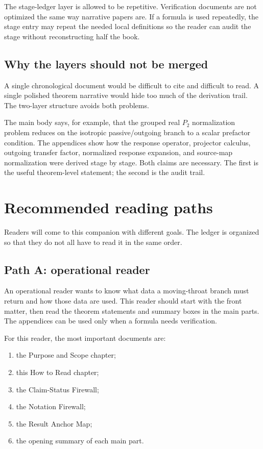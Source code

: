 The stage-ledger layer is allowed to be repetitive.  Verification documents are not optimized the same way narrative papers are.  If a formula is used repeatedly, the stage entry may repeat the needed local definitions so the reader can audit the stage without reconstructing half the book.

\subsection{Why the layers should not be merged}
\label{subsec:why-not-merge-layers}

A single chronological document would be difficult to cite and difficult to read.  A single polished theorem narrative would hide too much of the derivation trail.  The two-layer structure avoids both problems.

The main body says, for example, that the grouped real \(P_2\) normalization problem reduces on the isotropic passive/outgoing branch to a scalar prefactor condition.  The appendices show how the response operator, projector calculus, outgoing transfer factor, normalized response expansion, and source-map normalization were derived stage by stage.  Both claims are necessary.  The first is the useful theorem-level statement; the second is the audit trail.

\section{Recommended reading paths}
\label{sec:recommended-reading-paths}

Readers will come to this companion with different goals.  The ledger is organized so that they do not all have to read it in the same order.

\subsection{Path A: operational reader}
\label{subsec:path-operational}

An operational reader wants to know what data a moving-throat branch must return and how those data are used.  This reader should start with the front matter, then read the theorem statements and summary boxes in the main parts.  The appendices can be used only when a formula needs verification.

For this reader, the most important documents are:
\begin{enumerate}[leftmargin=2.2em]
  \item the Purpose and Scope chapter;
  \item this How to Read chapter;
  \item the Claim-Status Firewall;
  \item the Notation Firewall;
  \item the Result Anchor Map;
  \item the opening summary of each main part.
\end{enumerate}

